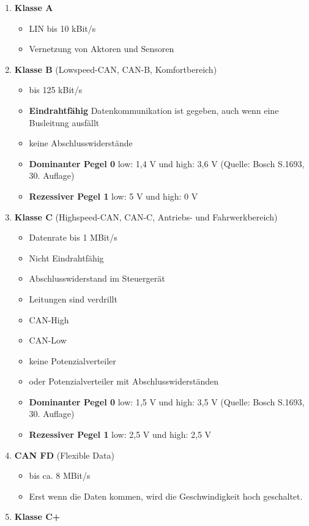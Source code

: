 \begin{enumerate}
\item
  \textbf{Klasse A}

  \begin{itemize}
  \item
    LIN bis 10 kBit/s
  \item
    Vernetzung von Aktoren und Sensoren
  \end{itemize}
\item
  \textbf{Klasse B} (Lowspeed-CAN, CAN-B, Komfortbereich)

  \begin{itemize}
  \item
    bis 125 kBit/s
  \item
    \textbf{Eindrahtfähig} Datenkommunikation ist gegeben, auch wenn
    eine Busleitung ausfällt
  \item
    keine Abschlusswiderstände
  \item
    \textbf{Dominanter Pegel 0} low: 1,4 V und high: 3,6 V (Quelle:
    Bosch S.1693, 30. Auflage)
  \item
    \textbf{Rezessiver Pegel 1} low: 5 V und high: 0 V
  \end{itemize}
\item
  \textbf{Klasse C} (Highspeed-CAN, CAN-C, Antriebs- und
  Fahrwerkbereich)

  \begin{itemize}
  \item
    Datenrate bis 1 MBit/s
  \item
    Nicht Eindrahtfähig
  \item
    Abschlusswiderstand im Steuergerät
  \item
    Leitungen sind verdrillt
  \item
    CAN-High
  \item
    CAN-Low
  \item
    keine Potenzialverteiler
  \item
    oder Potenzialverteiler mit Abschlusswiderständen
  \item
    \textbf{Dominanter Pegel 0} low: 1,5 V und high: 3,5 V (Quelle:
    Bosch S.1693, 30. Auflage)
  \item
    \textbf{Rezessiver Pegel 1} low: 2,5 V und high: 2,5 V
  \end{itemize}
\item
  \textbf{CAN FD} (Flexible Data)

  \begin{itemize}
  \item
    bis ca. 8 MBit/s
  \item
    Erst wenn die Daten kommen, wird die Geschwindigkeit hoch
    geschaltet.
  \end{itemize}
\item
  \textbf{Klasse C+}


\end{enumerate}
